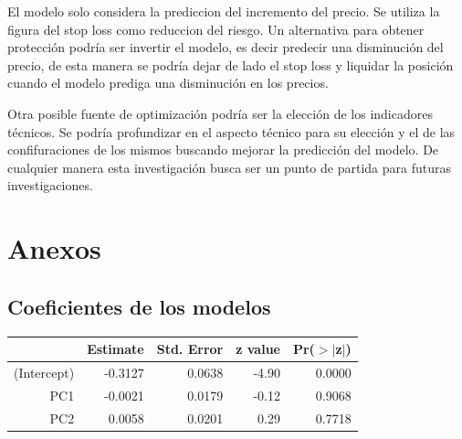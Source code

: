 \documentclass[a4paper,12pt]{Latex/Classes/PhDthesisPSnPDF}
\begin{document}
El modelo solo considera la prediccion del incremento del precio. Se utiliza la figura del stop loss como reduccion del riesgo. Un alternativa para obtener protección podría ser invertir el modelo, es decir predecir una disminución del precio, de esta manera se podría dejar de lado el stop loss y liquidar la posición cuando el modelo prediga una disminución en los precios.

Otra posible fuente de optimización podría ser la elección de los indicadores técnicos. Se podría profundizar en el aspecto técnico para su elección y el de las confifuraciones de los mismos buscando mejorar la predicción del modelo. De cualquier manera esta investigación busca ser un punto de partida para futuras investigaciones.



\chapter{Anexos}

\section{Coeficientes de los modelos}

\begin{center}
\begin{table}[ht]
\centering
\begin{tabular}{rrrrr}
  \hline
 & Estimate & Std. Error & z value & Pr($>$$|$z$|$) \\ 
  \hline
(Intercept) & -0.3127 & 0.0638 & -4.90 & 0.0000 \\ 
  PC1 & -0.0021 & 0.0179 & -0.12 & 0.9068 \\ 
  PC2 & 0.0058 & 0.0201 & 0.29 & 0.7718 \\ 
   \hline
\end{tabular}
\end{table}\end{center}
\end{document}

